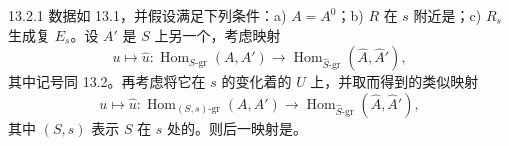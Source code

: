 \begin{SGAresult}{}{13.2.1}
数据如 13.1，并假设满足下列条件：a) $A=A^0$；b) $R$ 在 $s$ 附近是；c) $R_s$ 生成复 $E_s$。设 $A'$ 是 $S$ 上另一个，考虑映射
\[
 u\longmapsto\widehat u:
 \operatorname{Hom}_{S\text{-gr}}(A,A')\longrightarrow
 \operatorname{Hom}_{\widehat S\text{-gr}}(\widehat A,\widehat A'),
\]
其中记号同 13.2。再考虑将它在 $s$ 的变化着的 $U$ 上，并取而得到的类似映射
\begin{equation}
 u\longmapsto\widehat u:
 \operatorname{Hom}_{(S,s)\text{-gr}}(A,A')\longrightarrow
 \operatorname{Hom}_{\widehat S\text{-gr}}(\widehat A,\widehat A'),
 \tag{13.2.1.1}
\end{equation}
其中 $(S,s)$ 表示 $S$ 在 $s$ 处的。则后一映射是。
\end{SGAresult}
